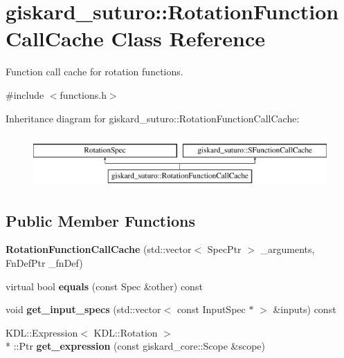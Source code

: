 \hypertarget{classgiskard__suturo_1_1RotationFunctionCallCache}{\section{giskard\-\_\-suturo\-:\-:Rotation\-Function\-Call\-Cache Class Reference}
\label{classgiskard__suturo_1_1RotationFunctionCallCache}
}


Function call cache for rotation functions.  




{\ttfamily \#include $<$functions.\-h$>$}

Inheritance diagram for giskard\-\_\-suturo\-:\-:Rotation\-Function\-Call\-Cache\-:\begin{figure}[H]
\begin{center}
\leavevmode
\includegraphics[height=2.000000cm]{classgiskard__suturo_1_1RotationFunctionCallCache}
\end{center}
\end{figure}
\subsection*{Public Member Functions}
\begin{DoxyCompactItemize}
\item 
\hypertarget{classgiskard__suturo_1_1RotationFunctionCallCache_a9c76b124b063a8b07ace19c21750d946}{{\bfseries Rotation\-Function\-Call\-Cache} (std\-::vector$<$ Spec\-Ptr $>$ \-\_\-arguments, Fn\-Def\-Ptr \-\_\-fn\-Def)}\label{classgiskard__suturo_1_1RotationFunctionCallCache_a9c76b124b063a8b07ace19c21750d946}

\item 
\hypertarget{classgiskard__suturo_1_1RotationFunctionCallCache_ac6d90bd38c00c85a0aa10921e8010022}{virtual bool {\bfseries equals} (const Spec \&other) const }\label{classgiskard__suturo_1_1RotationFunctionCallCache_ac6d90bd38c00c85a0aa10921e8010022}

\item 
\hypertarget{classgiskard__suturo_1_1RotationFunctionCallCache_a4320e7fbebc6da03373194e65c5b2ced}{void {\bfseries get\-\_\-input\-\_\-specs} (std\-::vector$<$ const Input\-Spec $\ast$ $>$ \&inputs) const }\label{classgiskard__suturo_1_1RotationFunctionCallCache_a4320e7fbebc6da03373194e65c5b2ced}

\item 
\hypertarget{classgiskard__suturo_1_1RotationFunctionCallCache_a41bd8af2cbebc218266bd98be1ee8868}{K\-D\-L\-::\-Expression$<$ K\-D\-L\-::\-Rotation $>$\\*
\-::Ptr {\bfseries get\-\_\-expression} (const giskard\-\_\-core\-::\-Scope \&scope)}\label{classgiskard__suturo_1_1RotationFunctionCallCache_a41bd8af2cbebc218266bd98be1ee8868}

\end{DoxyCompactItemize}
